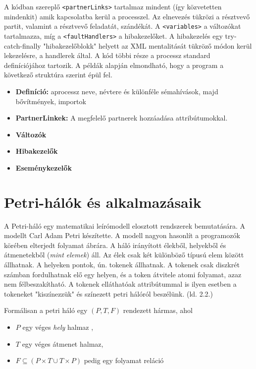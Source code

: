 \documentclass[12pt,a4paper]{book}
\begin{document}
 A kódban szereplő \texttt{<partnerLinks>} tartalmaz mindent (így közvetetten mindenkit) amik kapcsolatba kerül a processzel. Az elnevezés tükrözi a résztvevő partit, valamint a résztvevő feladatát, szándékát. A \texttt{<variables>} a változókat tartalmazza, míg a \texttt{<faultHandlers>} a hibakezelőket. A hibakezelés egy try-catch-finally "hibakezelőblokk" helyett az XML mentalitását tükröző módon kerül lekezelésre, a handlerek által. A kód többi része a processz standard definíciójához tartozik. A példák alapján elmondható, hogy a program a következő struktúra szerint épül fel.
\begin{itemize}
\item \textbf{Definíció: } aprocessz neve, névtere és különféle sémahívások, majd bővítmények, importok
\item \textbf{PartnerLinkek: } A megfelelő partnerek hozzáadása attribútumokkal. 
\item \textbf{Változók}
\item \textbf{Hibakezelők}
\item\textbf{Eseménykezelők}
\end{itemize}

\chapter{Petri-hálók és alkalmazásaik}

A Petri-háló egy matematikai leírómodell elosztott rendszerek bemutatására.
A modellt Carl Adam Petri készítette.
A modell nagyon hasonlít a programozók körében elterjedt folyamat ábrára.
A háló irányított élekből, helyekből és átmenetekből (\textsl{mint elemek}) áll.
Az élek csak két különböző típusú elem között állhatnak.
A helyeken pontok, ún. tokenek állhatnak.
A tokenek csak diszkrét számban fordulhatnak elő egy helyen, és a token átvitele atomi folyamat, azaz nem félbeszakítható.
A tokenek elláthatóak attribútummal is ilyen esetben a tokeneket "kiszínezzük" és színezett petri hálóról beszélünk. (ld. 2.2.) %

Formálisan  a petri háló egy \((P, T, F)\) rendezett hármas, ahol 
\begin{itemize}
\item $P$ egy véges \textsl{hely} halmaz ,
\item $T$ egy véges átmenet halmaz,
\item $F\subseteq (P\times T\cup T\times P)$ pedig egy folyamat reláció
\end{itemize}
\end{document}

